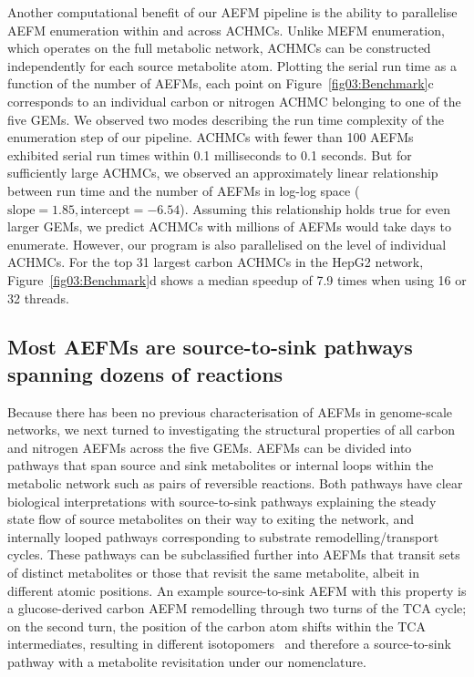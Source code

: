 \documentclass[12pt]{article}
\begin{document}
Another computational benefit of our AEFM pipeline is the ability to
parallelise AEFM enumeration within and across ACHMCs. Unlike MEFM
enumeration, which operates on the full metabolic network, ACHMCs can be
constructed independently for each source metabolite atom. Plotting the
serial run time as a function of the number of AEFMs, each point on
Figure~\ref{fig03:Benchmark}c corresponds to an individual carbon or
nitrogen ACHMC belonging to one of the five GEMs. We observed two modes
describing the run time complexity of the enumeration step of our
pipeline. ACHMCs with fewer than 100 AEFMs exhibited serial run times
within 0.1 milliseconds to 0.1 seconds. But for sufficiently large ACHMCs,
we observed an approximately linear relationship between run time and the
number of AEFMs in log-log space ($\text{slope}=1.85,
\text{intercept}=-6.54$). Assuming this relationship holds true for even
larger GEMs, we predict ACHMCs with millions of AEFMs would take days to
enumerate. However, our program is also parallelised on the level of
individual ACHMCs. For the top 31 largest carbon ACHMCs in the HepG2
network, Figure~\ref{fig03:Benchmark}d shows a median speedup of 7.9 times
when using 16 or 32 threads.

\subsection*{Most AEFMs are source-to-sink pathways spanning dozens of reactions}

Because there has been no previous characterisation of AEFMs in
genome-scale networks, we next turned to investigating the structural
properties of all carbon and nitrogen AEFMs across the five GEMs. AEFMs
can be divided into pathways that span source and sink metabolites or
internal loops within the metabolic network such as pairs of reversible
reactions. Both pathways have clear biological interpretations with
source-to-sink pathways explaining the steady state flow of source
metabolites on their way to exiting the network, and internally looped
pathways corresponding to substrate remodelling/transport cycles. These
pathways can be subclassified further into AEFMs that transit sets of
distinct metabolites or those that revisit the same metabolite, albeit in
different atomic positions. An example source-to-sink AEFM with this
property is a glucose-derived carbon AEFM remodelling through two turns of
the TCA cycle; on the second turn, the position of the carbon atom shifts
within the TCA intermediates, resulting in different
isotopomers~\citep{DuanLikun20221tas} and therefore a source-to-sink
pathway with a metabolite revisitation under our nomenclature. 
\end{document}
